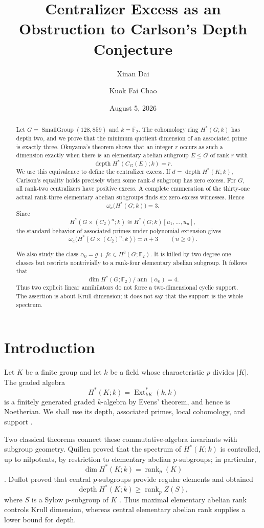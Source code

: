 \documentclass[11pt]{amsart}
\title[Centralizer excess and Carlson's conjecture]{Centralizer Excess as an Obstruction to Carlson's Depth Conjecture}
\author{Xinan Dai}
\author{Kuok Fai Chao}
\date{August 5, 2026}
\theoremstyle{definition}
\theoremstyle{remark}
\DeclareMathOperator{\depth}{depth}
\DeclareMathOperator{\ann}{ann}
\DeclareMathOperator{\rank}{rank}
\DeclareMathOperator{\Ext}{Ext}
\newcommand{\F}{\mathbb F}
\newcommand{\kbar}{\overline{\mathbb F}_{2}}
\newcommand{\SG}[2]{\operatorname{SmallGroup}(#1,#2)}
\begin{document}
\begin{abstract}
Let $G=\SG{128}{859}$ and $k=\kbar$.  The cohomology ring $H^*(G;k)$ has depth two, and we prove that the minimum quotient dimension of an associated prime is exactly three.  Okuyama's theorem shows that an integer $r$ occurs as such a dimension exactly when there is an elementary abelian subgroup $E\leq G$ of rank $r$ with
\[
\depth H^*(C_G(E);k)=r.
\]
We use this equivalence to define the centralizer excess.  If $d=\depth H^*(K;k)$, Carlson's equality holds precisely when some rank-$d$ subgroup has zero excess.  For $G$, all rank-two centralizers have positive excess.  A complete enumeration of the thirty-one actual rank-three elementary abelian subgroups finds six zero-excess witnesses.  Hence
\[
\omega_a\bigl(H^*(G;k)\bigr)=3.
\]
Since
\[
H^*(G\times(C_2)^n;k)\cong H^*(G;k)[u_1,\dots,u_n],
\]
the standard behavior of associated primes under polynomial extension gives
\[
\omega_a\bigl(H^*(G\times(C_2)^n;k)\bigr)=n+3
\qquad(n\geq0).
\]

We also study the class $\alpha_0=g+fc\in H^3(G;\F_2)$.  It is killed by two degree-one classes but restricts nontrivially to a rank-four elementary abelian subgroup.  It follows that
\[
\dim H^*(G;\F_2)/\ann(\alpha_0)=4.
\]
Thus two explicit linear annihilators do not force a two-dimensional cyclic support.  The assertion is about Krull dimension; it does not say that the support is the whole spectrum.
\end{abstract}

\maketitle

\section{Introduction}
\label{sec:introduction}

Let $K$ be a finite group and let $k$ be a field whose characteristic $p$ divides $|K|$.  The graded algebra
\[
H^*(K;k)=\Ext^*_{kK}(k,k)
\]
is a finitely generated graded $k$-algebra by Evens' theorem, and hence is Noetherian.  We shall use its depth, associated primes, local cohomology, and support \cite{Evens1961,EvensBook}.

Two classical theorems connect these commutative-algebra invariants with subgroup geometry.  Quillen proved that the spectrum of $H^*(K;k)$ is controlled, up to nilpotents, by restriction to elementary abelian $p$-subgroups; in particular,
\[
\dim H^*(K;k)=\rank_p(K)
\]
\cite{QuillenI,QuillenII,QuillenVenkov}.  Duflot proved that central $p$-subgroups provide regular elements and obtained
\[
\depth H^*(K;k)\geq \rank_p Z(S),
\]
where $S$ is a Sylow $p$-subgroup of $K$ \cite{Duflot1981}.  Thus maximal elementary abelian rank controls Krull dimension, whereas central elementary abelian rank supplies a lower bound for depth.
\end{document}
